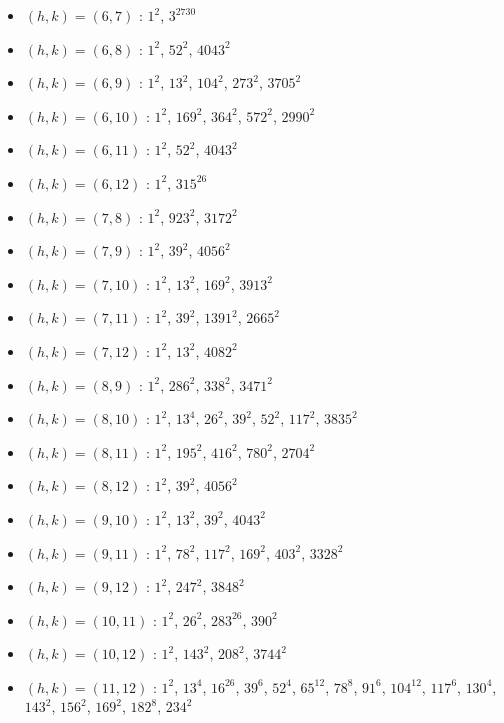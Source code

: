 \begin{itemize}
\item $(h,k)=(6,7)$ : $1^{2}$, $3^{2730}$
\item $(h,k)=(6,8)$ : $1^{2}$, $52^{2}$, $4043^{2}$
\item $(h,k)=(6,9)$ : $1^{2}$, $13^{2}$, $104^{2}$, $273^{2}$, $3705^{2}$
\item $(h,k)=(6,10)$ : $1^{2}$, $169^{2}$, $364^{2}$, $572^{2}$, $2990^{2}$
\item $(h,k)=(6,11)$ : $1^{2}$, $52^{2}$, $4043^{2}$
\item $(h,k)=(6,12)$ : $1^{2}$, $315^{26}$
\item $(h,k)=(7,8)$ : $1^{2}$, $923^{2}$, $3172^{2}$
\item $(h,k)=(7,9)$ : $1^{2}$, $39^{2}$, $4056^{2}$
\item $(h,k)=(7,10)$ : $1^{2}$, $13^{2}$, $169^{2}$, $3913^{2}$
\item $(h,k)=(7,11)$ : $1^{2}$, $39^{2}$, $1391^{2}$, $2665^{2}$
\item $(h,k)=(7,12)$ : $1^{2}$, $13^{2}$, $4082^{2}$
\item $(h,k)=(8,9)$ : $1^{2}$, $286^{2}$, $338^{2}$, $3471^{2}$
\item $(h,k)=(8,10)$ : $1^{2}$, $13^{4}$, $26^{2}$, $39^{2}$, $52^{2}$, $117^{2}$, $3835^{2}$
\item $(h,k)=(8,11)$ : $1^{2}$, $195^{2}$, $416^{2}$, $780^{2}$, $2704^{2}$
\item $(h,k)=(8,12)$ : $1^{2}$, $39^{2}$, $4056^{2}$
\item $(h,k)=(9,10)$ : $1^{2}$, $13^{2}$, $39^{2}$, $4043^{2}$
\item $(h,k)=(9,11)$ : $1^{2}$, $78^{2}$, $117^{2}$, $169^{2}$, $403^{2}$, $3328^{2}$
\item $(h,k)=(9,12)$ : $1^{2}$, $247^{2}$, $3848^{2}$
\item $(h,k)=(10,11)$ : $1^{2}$, $26^{2}$, $283^{26}$, $390^{2}$
\item $(h,k)=(10,12)$ : $1^{2}$, $143^{2}$, $208^{2}$, $3744^{2}$
\item $(h,k)=(11,12)$ : $1^{2}$, $13^{4}$, $16^{26}$, $39^{6}$, $52^{4}$, $65^{12}$, $78^{8}$, $91^{6}$, $104^{12}$, $117^{6}$, $130^{4}$, $143^{2}$, $156^{2}$, $169^{2}$, $182^{8}$, $234^{2}$
\end{itemize}
